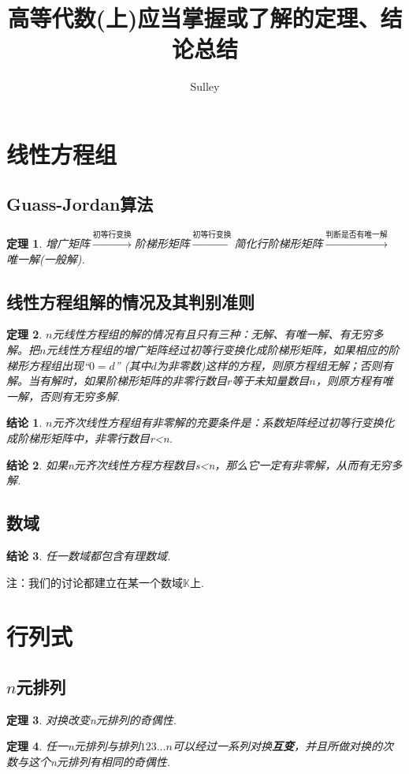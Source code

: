 \documentclass[UTF8]{article}
\title{\textbf{高等代数(上)应当掌握或了解的定理、结论总结}}
\author{Sulley}
\date{}
\newtheorem{thrm}{定理}[subsection]
\newtheorem{ccl}{结论}[subsection]
\begin{document}
\maketitle
\tableofcontents
\clearpage
\section{线性方程组}
\subsection{Guass-Jordan算法}
\begin{thrm}
  增广矩阵$\xrightarrow{\text{初等行变换}}$阶梯形矩阵$\xrightarrow{\text{初等行变换}}$简化行阶梯形矩阵$\xrightarrow{\text{判断是否有唯一解}}$
  唯一解(一般解).
\end{thrm}

\subsection{线性方程组解的情况及其判别准则}
\begin{thrm}
  $n$元线性方程组的解的情况有且只有三种：无解、有唯一解、有无穷多解。把$n$元线性方程组的增广矩阵经过初等行变换化成阶梯形矩阵，如果相应的阶梯形方程组出现``$0=d$''
  (其中$d$为非零数)这样的方程，则原方程组无解；否则有解。当有解时，如果阶梯形矩阵的非零行数目$r$等于未知量数目$n$，则原方程有唯一解，否则有无穷多解.
\end{thrm}
\begin{ccl}
  $n$元齐次线性方程组有非零解的充要条件是：系数矩阵经过初等行变换化成阶梯形矩阵中，非零行数目r<n.
\end{ccl}
\begin{ccl}
  如果n元齐次线性方程方程数目s<n，那么它一定有非零解，从而有无穷多解.
\end{ccl}

\subsection{数域}
\begin{ccl}
  任一数域都包含有理数域.
\end{ccl}
注：我们的讨论都建立在某一个数域$\mathbb{K}$上.

\section{行列式}
\subsection{$n$元排列}
\begin{thrm}
  对换改变n元排列的奇偶性.
\end{thrm}
\begin{thrm}
  任一n元排列与排列$123\ldots n$可以经过一系列对换\textbf{互变}，并且所做对换的次数与这个n元排列有相同的奇偶性.
\end{thrm}
\end{document}
